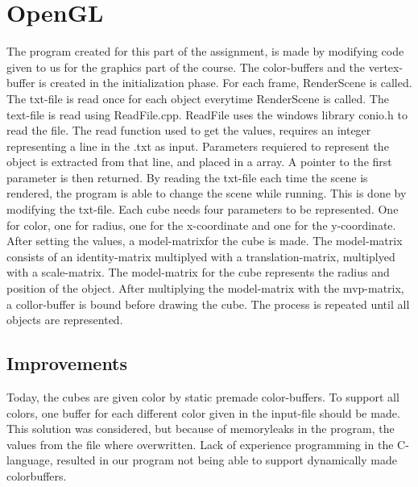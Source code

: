 \section{OpenGL}
The program created for this part of the assignment, 
is made by modifying code given to us for the graphics part of the course. 
The color-buffers and the vertex-buffer is created in the initialization phase. 
For each frame, RenderScene is called. 
The txt-file is read once for each object everytime RenderScene is called.
The text-file is read using ReadFile.cpp.
ReadFile uses the windows library conio.h to read the file. 
The read function used to get the values, requires an integer representing a line in the .txt as input.
Parameters requiered to represent the object is extracted from that line, and placed in a array.
A pointer to the first parameter is then returned.
By reading the txt-file each time the scene is rendered, the program is able to change the scene while running.
This is done by modifying the txt-file. 
Each cube needs four parameters to be represented.
One for color, one for radius, one for the x-coordinate and one for the y-coordinate. 
After setting the values, a model-matrixfor the cube is made. 
The model-matrix consists of an identity-matrix multiplyed with a translation-matrix, multiplyed with a scale-matrix. 
The model-matrix for the cube represents the radius and position of the object. 
After multiplying the model-matrix with the mvp-matrix, a collor-buffer is bound before drawing the cube. 
The process is repeated until all objects are represented. 


\subsection{Improvements}
Today, the cubes are given color by static premade color-buffers. 
To support all colors, one buffer for each different color given in the input-file should be made. 
This solution was considered, but because of memoryleaks in the program, the values from the file where overwritten. 
Lack of experience programming in the C-language, resulted in our program not being able to support dynamically made colorbuffers.


